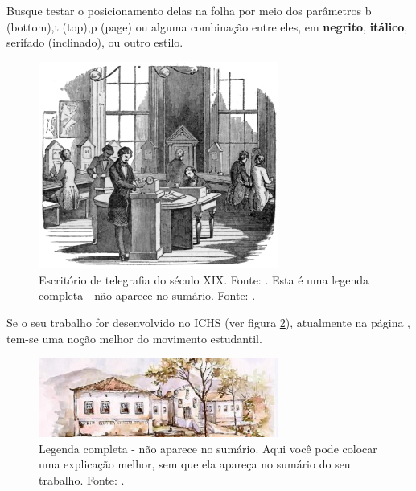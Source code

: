 \documentclass[
	12pt,				%
	openright,			%
	oneside,			%
	a4paper,			%
	english,			%
	brazil				%
	]{abntex2}
\begin{document}
Busque testar o posicionamento delas na folha por meio dos parâmetros b (bottom),t (top),p (page) ou alguma combinação entre eles, em \textbf{negrito}, \textbf{itálico}, \textsf{serifado (inclinado)}, ou outro estilo.

\begin{figure}[h] %
\centering
\includegraphics[width=0.7\textwidth]{fig09.pdf}
\caption[Escritório de telégrafos. Esta aparece apenas no sumário]{Escritório de telegrafia do século XIX. Fonte: \textcite{thomson_1869}. Esta é uma legenda completa - não aparece no sumário. Fonte: \textcite{boyle1772}.}
\label{fig:308}
\end{figure}



Se o seu trabalho for desenvolvido no ICHS (ver figura \ref{fig:309}), atualmente na página \pageref{fig:309}, tem-se uma noção melhor do movimento estudantil.

\begin{figure}[h]
	\centering
	\includegraphics[width=0.7\textwidth]{ichs2.jpg} %
	\caption[Legenda reduzida - aparece apenas no sumário]{Legenda completa - não aparece no sumário. Aqui você pode colocar uma explicação melhor, sem que ela apareça no sumário do seu trabalho. Fonte: \cite[p.~117]{boyle1772}.}
	\label{fig:309}
\end{figure}
\end{document}
